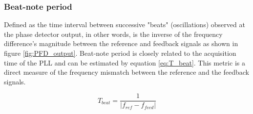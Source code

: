 \subsubsection{Beat-note period}
Defined as the time interval between successive "beats" (oscillations) observed at the phase detector output, in other words, is the inverse of
the frequency difference's magnitude between the reference and feedback signals as shown in figure \ref{fig:PFD_output}. Beat-note period is closely related to the acquisition time of the
PLL and can be estimated by equation \eqref{eq:T_beat}. This metric is a direct measure of the frequency mismatch between the reference and
the feedback signals.

\begin{equation}
    T_{beat} = \frac{1}{|f_{ref} - f_{feed}|}
    \label{eq:T_beat}
\end{equation}


